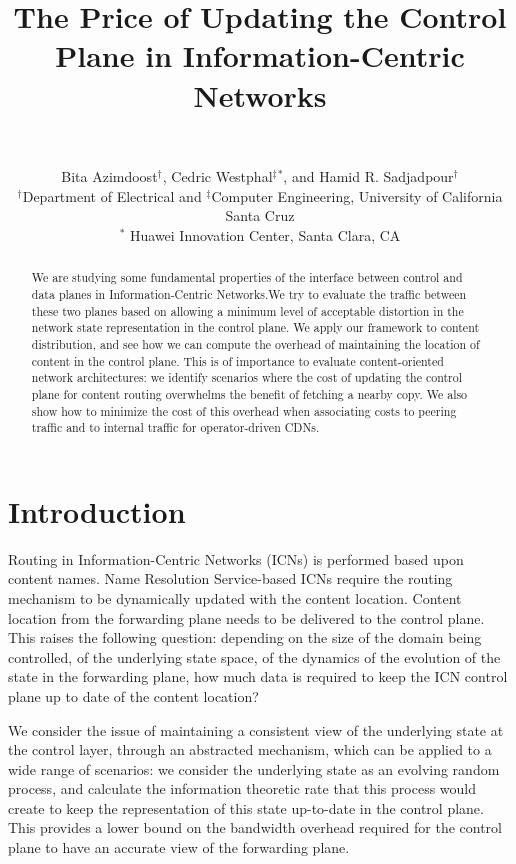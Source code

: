 \documentclass[conference]{IEEEtran}
\theoremstyle{plain}
\theoremstyle{remark}
\begin{document}
\title{The Price of Updating the Control Plane in Information-Centric Networks}

\author{\,}

\author{Bita Azimdoost$^{\dagger}$, Cedric Westphal$^\ddagger$$^*$, and Hamid R. Sadjadpour$^\dagger$\\
$^\dagger$Department of Electrical and $^\ddagger$Computer Engineering, 
University of California Santa Cruz\\
$^*$ Huawei Innovation Center, Santa Clara, CA
}

\maketitle

\begin{abstract}
We are studying some fundamental properties of the interface between control and data planes in Information-Centric Networks.We try to evaluate the traffic between these two planes based on allowing a minimum level of acceptable distortion in the network state representation in the control plane. We apply our framework to content distribution, and see how we can compute the overhead of maintaining the location of content in the control plane. This is of importance to evaluate content-oriented network architectures: we identify scenarios where the cost of updating the control plane for content routing overwhelms the benefit of fetching a nearby copy. We also show how to minimize the cost of this overhead when associating costs to peering traffic and to internal traffic for operator-driven CDNs.
\end{abstract}

\section{Introduction}

Routing in Information-Centric Networks (ICNs) is performed based upon content names. Name Resolution Service-based ICNs \cite{Ahlgren2012Survey} require the routing mechanism to be dynamically updated with the content location. Content location from the forwarding plane needs to be delivered to the control plane. This raises the following question: depending on the size of the domain being controlled, of the underlying state space, of the dynamics of the evolution of the state in the forwarding plane, how much data is required to keep the ICN control plane up to date of the content location?

We consider the issue of maintaining a consistent view of the underlying state at the control layer, through an abstracted mechanism, which can be applied to a wide range of scenarios: we consider the underlying state as an evolving random  process, and calculate the information theoretic rate that this process would create to keep the representation of this state up-to-date in the control plane. This provides a lower bound on the bandwidth overhead required for the control plane to have an accurate view of the forwarding plane.
\end{document}

